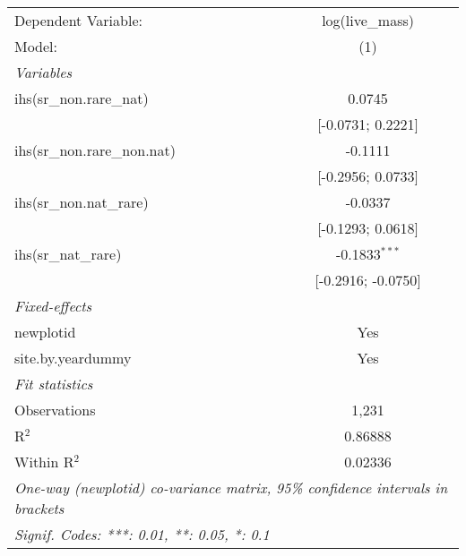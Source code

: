 \begin{tabular}{lc}
\tabularnewline\midrule\midrule
Dependent Variable:&log(live\_mass)\\
Model:&(1)\\
\midrule \emph{Variables}&  \\
ihs(sr\_non.rare\_nat)&0.0745\\
  &[-0.0731; 0.2221]\\
ihs(sr\_non.rare\_non.nat)&-0.1111\\
  &[-0.2956; 0.0733]\\
ihs(sr\_non.nat\_rare)&-0.0337\\
  &[-0.1293; 0.0618]\\
ihs(sr\_nat\_rare)&-0.1833$^{***}$\\
  &[-0.2916; -0.0750]\\
\midrule \emph{Fixed-effects}&  \\
newplotid & Yes\\
site.by.yeardummy & Yes\\
\midrule \emph{Fit statistics}&  \\
Observations & 1,231\\
R$^2$ & 0.86888\\
Within R$^2$ & 0.02336\\
\midrule\midrule\multicolumn{2}{l}{\emph{One-way (newplotid) co-variance matrix, 95\% confidence intervals in brackets}}\\
\multicolumn{2}{l}{\emph{Signif. Codes: ***: 0.01, **: 0.05, *: 0.1}}\\
\end{tabular}


